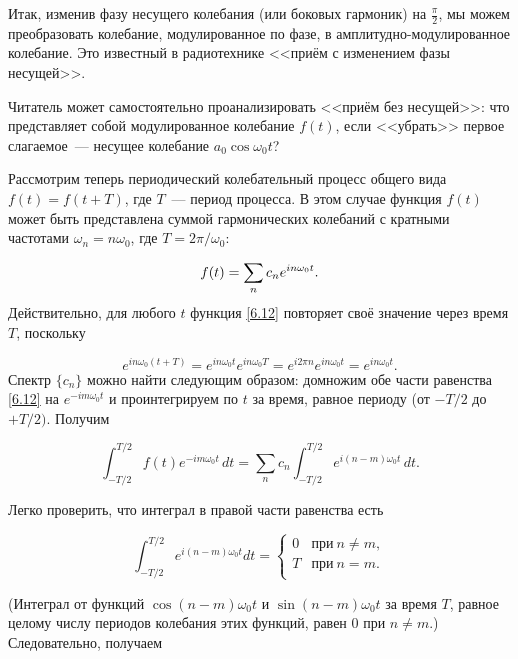 Итак, изменив фазу несущего колебания (или боковых гармоник) на  $\frac{\pi}{2}$, мы можем преобразовать колебание,
модулированное по фазе, в амплитудно-модулированное колебание. Это известный в радиотехнике <<приём с изменением фазы несущей>>.

Читатель может самостоятельно проанализировать <<приём без несущей>>: что представляет собой модулированное колебание
$f(t)$, если <<убрать>> первое слагаемое~--- несущее колебание $a_0\cos\omega_0t$?


Рассмотрим теперь периодический колебательный процесс общего вида $f(t)=f(t+T)$, где $T$~--- период процесса. В этом
случае функция $f(t)$ может быть представлена суммой гармонических колебаний с кратными частотами $\omega_n=n\omega_0$,
где $T=2\pi/\omega_0$:

\begin{equation}
	\eqmark{6.12}
	f(t)=\sum_n c_n e^{in\omega_0 t}.
\end{equation}
Действительно, для любого $t$ функция \eqref{6.12} повторяет своё значение через время $T$, поскольку

\begin{equation*}
	e^{in\omega_0(t+T)}=e^{in\omega_0t}e^{in\omega_0T}=e^{i2\pi n}e^{in\omega_0t}=e^{in\omega_0t}.
\end{equation*}
Спектр $\{c_n\}$ можно найти следующим образом: домножим обе части равенства \eqref{6.12} на $e^{-im\omega_0 t}$ и
проинтегрируем по $t$ за время, равное периоду (от $-T/2$ до $+T/2)$. Получим

\begin{equation*}
	\int_{-T/2}^{T/2} f(t)e^{-im\omega_0t}\,dt=\sum_n c_n\int_{-T/2}^{T/2} e^{i(n-m)\omega_0 t}\,dt.
\end{equation*}

Легко проверить, что интеграл в правой части равенства есть

\begin{equation*}
	\int_{-T/2}^{T/2}e^{i(n-m)\omega_0 t}dt =
	\begin{cases}
		0 & \text{при}~ n\ne m,\\
		T & \text{при}~ n = m.\\
	\end{cases}
\end{equation*}

(Интеграл от функций $\cos(n-m)\omega_0t$ и $\sin(n-m)\omega_0t$ за время $T$, равное целому числу периодов колебания этих
функций, равен 0 при $n\ne m$.) Следовательно, получаем

